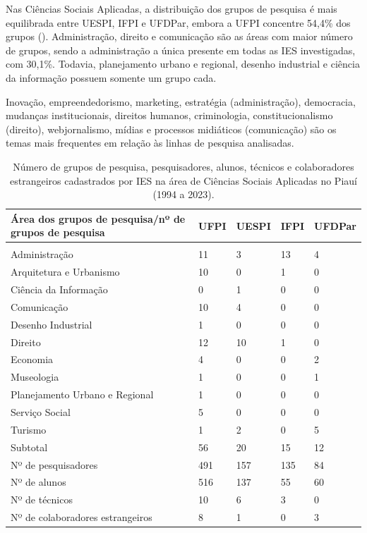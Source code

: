 \documentclass[portuguese]{textolivre}
\begin{document}
Nas Ciências Sociais Aplicadas, a distribuição dos grupos de pesquisa é mais equilibrada entre UESPI, IFPI e UFDPar, embora a UFPI concentre 54,4\% dos grupos (). Administração, direito e comunicação são as áreas com maior número de grupos, sendo a administração a única presente em todas as IES investigadas, com 30,1\%. Todavia, planejamento urbano e regional, desenho industrial e ciência da informação possuem somente um grupo cada.

Inovação, empreendedorismo, marketing, estratégia (administração), democracia, mudanças institucionais, direitos humanos, criminologia, constitucionalismo (direito), webjornalismo, mídias e processos midiáticos (comunicação) são os temas mais frequentes em relação às linhas de pesquisa analisadas.

\begin{table}[htbp]
\centering
\begin{threeparttable}
\caption{Número de grupos de pesquisa, pesquisadores, alunos, técnicos e colaboradores estrangeiros cadastrados por IES na área de Ciências Sociais Aplicadas no Piauí (1994 a 2023).}
\label{tbl9}
\begin{tabular}{>{\raggedright\arraybackslash}p{5cm} l l l l}
\toprule
Área dos grupos de pesquisa/nº de grupos de pesquisa & UFPI & UESPI & IFPI & UFDPar \\ 
\midrule
\multicolumn{5}{c}{Ciências Sociais Aplicadas} \\
\midrule
Administração & 11 & 3 & 13 & 4 \\
Arquitetura e Urbanismo & 10 & 0 & 1 & 0 \\
Ciência da Informação & 0 & 1 & 0 & 0 \\
Comunicação & 10 & 4 & 0 & 0 \\
Desenho Industrial & 1 & 0 & 0 & 0 \\
Direito & 12 & 10 & 1 & 0 \\
Economia & 4 & 0 & 0 & 2 \\
Museologia & 1 & 0 & 0 & 1 \\
Planejamento Urbano e Regional & 1 & 0 & 0 & 0 \\
Serviço Social & 5 & 0 & 0 & 0 \\
Turismo & 1 & 2 & 0 & 5 \\
\midrule
Subtotal & 56 & 20 & 15 & 12 \\
\midrule
Nº de pesquisadores & 491 & 157 & 135 & 84 \\ 
Nº de alunos & 516 & 137 & 55 & 60 \\
Nº de técnicos & 10 & 6 & 3 & 0 \\
Nº de colaboradores estrangeiros & 8 & 1 & 0 & 3 \\
\bottomrule
\end{tabular}
\end{threeparttable}
\end{table}
\end{document}
